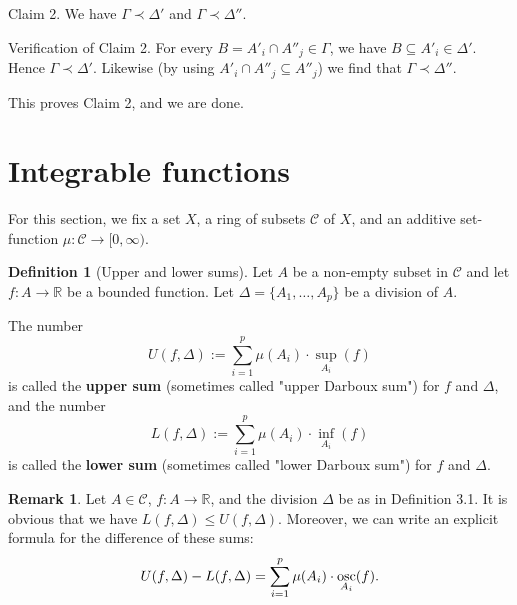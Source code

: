 \documentclass[11pt]{article}
\makeatletter
\theoremstyle{definition}
\newtheorem{defn}[thm]{Definition}
\newtheorem{remark}[thm]{Remark}
\newcommand{\R}{\ensuremath{\mathbb{R}}}
\newenvironment{pf}[1][\proofname]{\par
  \pushQED{\qed}%
  \normalfont \topsep0\p@\relax
  \trivlist
  \item[\hskip\labelsep\itshape
  #1\@addpunct{.}]\ignorespaces
}{%
  \popQED\endtrivlist\@endpefalse
}
\makeatother
\begin{document}
\begin{pf}
{\sc Claim 2.} We have $\Gamma \prec \Delta'$ and $\Gamma \prec \Delta''$. 

{\sc Verification of Claim 2.} For every $B = A'_i \cap A''_j \in \Gamma$, we have $B \subseteq A'_i \in \Delta'$. Hence $\Gamma \prec \Delta'$. Likewise (by using $A'_i \cap A''_j \subseteq A''_j$) we find that $\Gamma \prec \Delta''$.

This proves Claim 2, and we are done.
\end{pf}

\newpage
\section{Integrable functions}
For this section, we fix a set $X$, a ring of subsets $\mathcal{C}$ of $X$, and an additive set-function $\mu: \mathcal{C} \to [0, \infty)$. 

\begin{defn}[Upper and lower sums]
Let $A$ be a non-empty subset in $\mathcal{C}$ and let $f: A \to \R$ be a bounded function. Let $\Delta = \{A_1, \dots, A_p\}$ be a division of $A$. 

The number
$$U(f, \Delta) := \sum_{i=1}^p \mu(A_i) \cdot \sup_{A_i} (f)$$
is called the {\bf upper sum} (sometimes called "upper Darboux sum") for $f$ and $\Delta$, and the number 
$$L(f, \Delta) := \sum_{i=1}^p \mu(A_i) \cdot \inf_{A_i} (f)$$
is called the {\bf lower sum} (sometimes called "lower Darboux sum") for $f$ and $\Delta$.
\end{defn}

\begin{remark}
Let $A \in \mathcal{C}$, $f : A \to \R$, and the division $\Delta$ be as in Definition 3.1. It is obvious that we have $L(f, \Delta) \leq U(f, \Delta)$. Moreover, we can write an explicit formula for the difference of these sums:
$$U(f, \Delta) - L(f, \Delta) = \sum_{i=1}^p \mu(A_i) \cdot \underset{A_i}{\rm osc}(f).$$
\end{remark}
\end{document}
